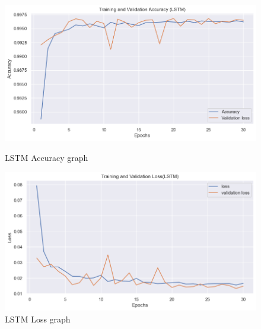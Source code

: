 		\begin{figure}[t]
			\centering
			\begin{minipage}{0.49\textwidth}
			  \centering
			  \includegraphics[width=1\textwidth]{figures/LSTM_training_validation.png}
			  \caption{LSTM Accuracy graph}
			  \label{fig:1}
			\end{minipage}
			\hfill
			\begin{minipage}{0.49\textwidth}
			  \centering
			  \includegraphics[width=1\textwidth]{figures/LSTM_training_validation_loss.png}
			  \caption{LSTM Loss graph}
			  \label{fig:2}
			\end{minipage}
		  \end{figure}
		  
		  \newpage

%
		




